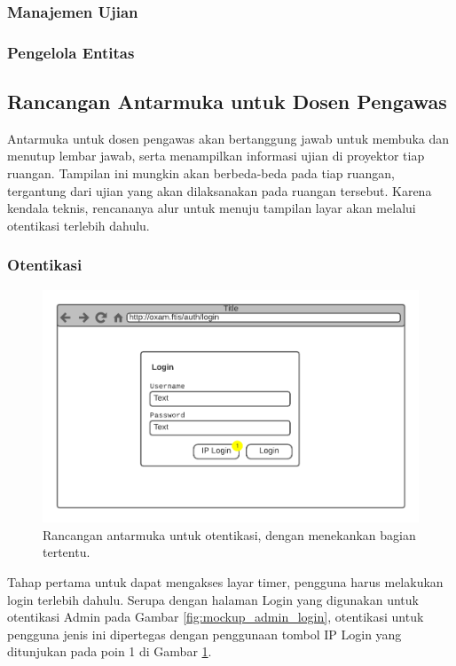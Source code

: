 \subsubsection{Manajemen Ujian}
    
    
    
    
\subsubsection{Pengelola Entitas}

\subsection{Rancangan Antarmuka untuk Dosen Pengawas}
    Antarmuka untuk dosen pengawas akan bertanggung jawab untuk membuka dan menutup lembar jawab,
    serta menampilkan informasi ujian di proyektor tiap ruangan. Tampilan ini mungkin akan 
    berbeda-beda pada tiap ruangan, tergantung dari ujian yang akan dilaksanakan pada ruangan
    tersebut. Karena kendala teknis, rencananya alur untuk menuju tampilan layar akan melalui otentikasi
    terlebih dahulu. 
    
\subsubsection{Otentikasi}
    \begin{figure}
        \centering
        \includegraphics[width=0.7\paperwidth]{Gambar/mockups/Mockup--DosenPengawas - Login.pdf}
        \caption{Rancangan antarmuka untuk otentikasi, dengan menekankan bagian tertentu.}
        \label{fig:mockup_dosen_login}
    \end{figure}
    Tahap pertama untuk dapat mengakses layar timer, pengguna harus melakukan login terlebih dahulu.
    Serupa dengan halaman Login yang digunakan untuk otentikasi Admin pada Gambar
    \ref{fig:mockup_admin_login}, otentikasi untuk pengguna jenis ini dipertegas dengan penggunaan
    tombol IP Login yang ditunjukan pada poin 1 di Gambar \ref{fig:mockup_dosen_login}.
    
